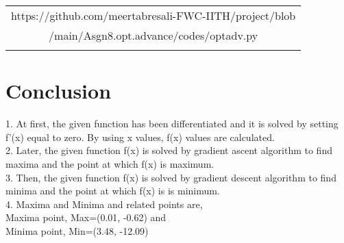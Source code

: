 \documentclass[journal,10pt,twocolumn]{article}
\begin{document}
\begin{table}[h]
\centering
\begin{tabular}{|c|} \hline
\rule{0pt}{10pt} 
https://github.com/meertabresali-FWC-IITH/project/blob \\
/main/Asgn8.opt.advance/codes/optadv.py\\
\\\hline
 \end{tabular}
\end{table}




\section{Conclusion}
\begin{flushleft}
1. At first, the given function has been differentiated and it is solved by setting f'(x) equal to zero. By using x values, f(x) values are calculated.\\
\vspace{0.25cm}
2. Later, the given function f(x) is solved by gradient ascent algorithm to find maxima and the point at which f(x) is maximum.\\
\vspace{0.25cm}
3. Then, the given function f(x) is solved by gradient descent algorithm to find minima and the point at which f(x) is is minimum.\\
\vspace{0.25cm}
4. Maxima and Minima and related points are, \\
\vspace{0.25cm}
\center
Maxima point, Max=(0.01, -0.62) and\\ 
\vspace{0.2cm}
Minima point, Min=(3.48, -12.09)
\end{flushleft}
\endcenter
\end{document}
